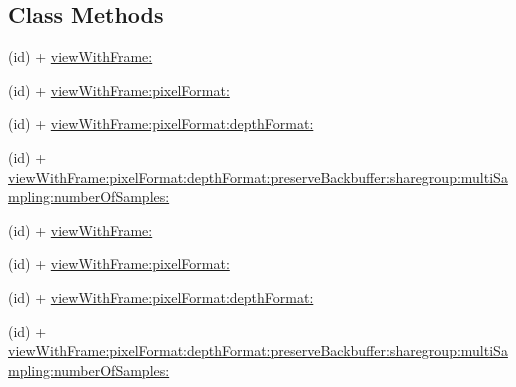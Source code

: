 \subsection*{Class Methods}
\begin{DoxyCompactItemize}
\item 
(id) + \hyperlink{interfaceCCEAGLView_a288ea52be7dd891bbc9e0ee7e18cdf24}{view\+With\+Frame\+:}
\item 
(id) + \hyperlink{interfaceCCEAGLView_aa74a52bd30eed3aaaf133db0c302842a}{view\+With\+Frame\+:pixel\+Format\+:}
\item 
(id) + \hyperlink{interfaceCCEAGLView_a5881eaa6db03c2702e9d15fcc63cb157}{view\+With\+Frame\+:pixel\+Format\+:depth\+Format\+:}
\item 
(id) + \hyperlink{interfaceCCEAGLView_a7dff59cc96c25a176ce8efda28b4e414}{view\+With\+Frame\+:pixel\+Format\+:depth\+Format\+:preserve\+Backbuffer\+:sharegroup\+:multi\+Sampling\+:number\+Of\+Samples\+:}
\item 
(id) + \hyperlink{interfaceCCEAGLView_a288ea52be7dd891bbc9e0ee7e18cdf24}{view\+With\+Frame\+:}
\item 
(id) + \hyperlink{interfaceCCEAGLView_aa74a52bd30eed3aaaf133db0c302842a}{view\+With\+Frame\+:pixel\+Format\+:}
\item 
(id) + \hyperlink{interfaceCCEAGLView_a5881eaa6db03c2702e9d15fcc63cb157}{view\+With\+Frame\+:pixel\+Format\+:depth\+Format\+:}
\item 
(id) + \hyperlink{interfaceCCEAGLView_a7dff59cc96c25a176ce8efda28b4e414}{view\+With\+Frame\+:pixel\+Format\+:depth\+Format\+:preserve\+Backbuffer\+:sharegroup\+:multi\+Sampling\+:number\+Of\+Samples\+:}
\end{DoxyCompactItemize}
